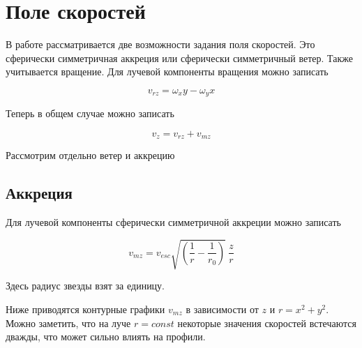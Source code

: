 \documentclass{article}
\begin{document}
\section{Поле скоростей}

В работе рассматривается две возможности задания поля скоростей. Это сферически симметричная аккреция или сферически симметричный ветер. Также учитывается вращение. Для лучевой компоненты вращения можно записать

\begin{equation}
v_{rz} = \omega_xy - \omega_yx
\end{equation}

Теперь в общем случае можно записать

\begin{equation}
v_z = v_{rz} + v_{mz}
\end{equation}

Рассмотрим отдельно ветер и аккрецию

\subsection{Аккреция}

Для лучевой компоненты сферически симметричной аккреции можно записать

\begin{equation}
v_{mz} = v_{esc}\sqrt{\left(\frac{1}{r} - \frac{1}{r_0}\right)}\ \frac{z}{r}
\end{equation}

Здесь радиус звезды взят за единицу.

Ниже приводятся контурные графики $v_{mz}$ в зависимости от $z$ и $r = x^2+y^2$. Можно заметить, что на луче $r = const$ некоторые значения скоростей встечаются дважды, что может сильно влиять на профили. 
\end{document}
